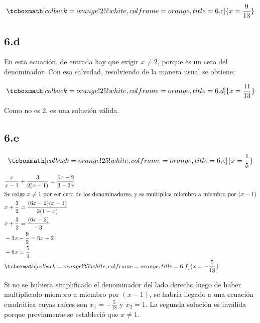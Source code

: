 \documentclass{article}
\begin{document}
\begin{equation}
\tcboxmath[colback=orange!25!white,colframe=orange, title=6.c] { x = \frac{9}{13} }
\end{equation}

\subsection*{6.d}
\label{subsec:6.d}

En esta ecuación, de entrada hay que exigir $x \neq 2$, porque es un cero del denominador. Con esa salvedad, resolviendo de la manera usual se obtiene:

\begin{equation}
\tcboxmath[colback=orange!25!white,colframe=orange, title=6.d] { x = \frac{11}{13} }
\end{equation}

Como no es 2, es una solución válida.

\subsection*{6.e}
\label{subsec:6.e}

\begin{equation}
\tcboxmath[colback=orange!25!white,colframe=orange, title=6.e] { x = \frac{1}{5} }
\end{equation}

\begin{subequations}
\begin{align}
& \frac{x}{x-1} + \frac{3}{2(x-1)} = \frac{6x-2}{3-3x} \\
& \text{Se exige } x \neq 1 \text{ por ser cero de los denominadores, y se multiplica miembro a miembro por } (x-1) \\
& x + \frac{3}{2} = \frac{(6x-2) (x-1)}{3 (1-x)} \\
& x + \frac{3}{2} = \frac{(6x-2)}{-3} \\
& -3x - \frac{9}{2} = 6x - 2 \\
& -9x = \frac{5}{2} \\
& \tcboxmath[colback=orange!25!white,colframe=orange, title=6.f] { x = -\frac{5}{18} }
\end{align}
\end{subequations}

Si no se hubiera simplificado el denominador del lado derecho luego de haber multiplicado miembro a miembro por $(x-1)$, se habría llegado a una ecuación cuadrática cuyas raíces son $x_1 = -\frac{5}{18}$ y $x_2 = 1$. La segunda solución es inválida porque previamente se estableció que $x \neq 1$.
\end{document}
